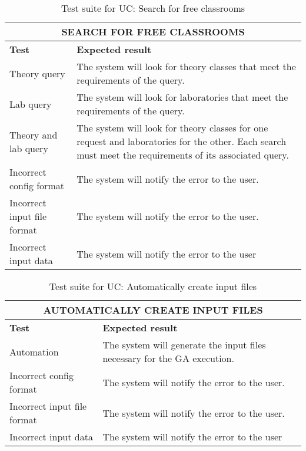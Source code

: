 \begin{table}[H]
    \centering
    \caption{Test suite for UC: Search for free classrooms}
    \label{uc-table-assignments}
    \begin{tabular}{|p{4cm}|p{8cm}|}
        \hline
        \multicolumn{2}{|c|}{\textbf{SEARCH FOR FREE CLASSROOMS}} \\
        \hline
        \textbf{Test} & \textbf{Expected result} \\
        \rowcolor{blue!30}
        Theory query & The system will look for theory classes that meet the requirements of the query. \\
        \rowcolor{blue!10}
        Lab query & The system will look for laboratories that meet the requirements of the query. \\
        \rowcolor{blue!30}
        Theory and lab query & The system will look for theory classes for one request and laboratories for the other. Each search must meet the requirements of its associated query. \\
        \rowcolor{blue!10}
        Incorrect config format & The system will notify the error to the user. \\
        \rowcolor{blue!30}
        Incorrect input file format & The system will notify the error to the user. \\
        \rowcolor{blue!10}
        Incorrect input data & The system will notify the error to the user \\
        \hline
    \end{tabular}
\end{table}


\begin{table}[H]
    \centering
    \caption{Test suite for UC: Automatically create input files}
    \label{uc-table-assignments}
    \begin{tabular}{|p{4cm}|p{8cm}|}
        \hline
        \multicolumn{2}{|c|}{\textbf{AUTOMATICALLY CREATE INPUT FILES}} \\
        \hline
        \textbf{Test} & \textbf{Expected result} \\
        \rowcolor{blue!30}
        Automation & The system will generate the input files necessary for the GA execution. \\
        \rowcolor{blue!10}
        Incorrect config format & The system will notify the error to the user. \\
        \rowcolor{blue!30}
        Incorrect input file format & The system will notify the error to the user. \\
        \rowcolor{blue!10}
        Incorrect input data & The system will notify the error to the user \\
        \hline
    \end{tabular}
\end{table}

